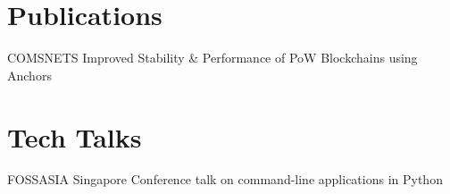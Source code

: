 \section{Publications}
    {COMSNETS}
    {}
    {}
    {
        Improved Stability \& Performance of PoW Blockchains using Anchors
    }
    {
    }
    \vspace*{-0.8cm}
    
\section{Tech Talks}
    {FOSSASIA}
    {}
    {Singapore}
    {
        Conference talk on command-line applications in Python
    }
    {
    }

